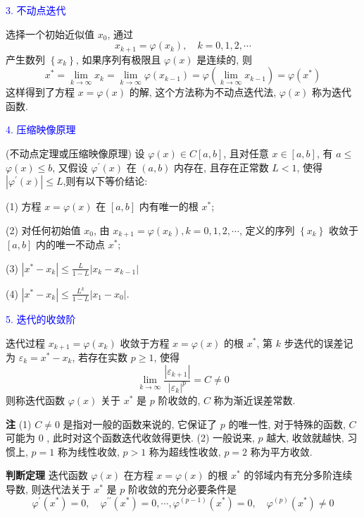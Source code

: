 \textcolor{blue}{3. 不动点迭代}

选择一个初始近似值 $ x_{0} $, 通过
$$
x_{k+1}=\varphi\left(x_{k}\right), \quad k=0,1,2, \cdots
$$
产生数列 $ \left\{x_{k}\right\} $, 如果序列有极限且 $ \varphi(x) $ 是连续的, 则
$$
x^{*}=\lim _{k \rightarrow \infty} x_{k}=\lim _{k \rightarrow \infty} \varphi\left(x_{k-1}\right)=\varphi\left(\lim _{k \rightarrow \infty} x_{k-1}\right)=\varphi\left(x^{*}\right)
$$
这样得到了方程 $ x=\varphi(x) $ 的解, 这个方法称为不动点迭代法, $ \varphi(x) $ 称为迭代函数.

\textcolor{blue}{4. 压缩映像原理}

(不动点定理或压缩映像原理) 设 $ \varphi(x) \in C[a, b] $, 且对任意 $ x \in[a, b] $, 有 $ a \leqslant $ $ \varphi(x) \leqslant b $, 又假设 $ \varphi^{\prime}(x) $ 在 $ (a, b) $ 内存在, 且存在正常数 $ L<1 $, 使得 $ \left|\varphi^{\prime}(x)\right| \leqslant L $,则有以下等价结论:

(1) 方程 $ x=\varphi(x) $ 在 $ [a, b] $ 内有唯一的根 $ x^{*} $;

(2) 对任何初始值 $ x_{0} $, 由 $ x_{k+1}=\varphi\left(x_{k}\right), k=0,1,2, \cdots $, 定义的序列 $ \left\{x_{k}\right\} $ 收敛于 $ [a, b] $ 内的唯一不动点 $ x^{*} ; $

(3) $\displaystyle \left|x^{*}-x_{k}\right| \leqslant \frac{L}{1-L}\left|x_{k}-x_{k-1}\right| $

(4) $\displaystyle \left|x^{*}-x_{k}\right| \leqslant \frac{L^{k}}{1-L}\left|x_{1}-x_{0}\right| $.

\textcolor{blue}{5. 迭代的收敛阶}

迭代过程 $ x_{k+1}=\varphi\left(x_{k}\right) $ 收敛于方程 $ x=\varphi(x) $ 的根 $ x^{*} $, 第 $ k $ 步迭代的误差记为 $ \varepsilon_{k}=x^{*}-x_{k} $, 若存在实数 $ p \geqslant 1 $, 使得
$$
\lim _{k \rightarrow \infty} \frac{\left|\varepsilon_{k+1}\right|}{\left|\varepsilon_{k}\right|^{p}}=C \neq 0
$$
则称迭代函数 $ \varphi(x) $ 关于 $ x^{*} $ 是 $ p $ 阶收敛的, $ C $ 称为渐近误差常数.

\textbf{注 }\; (1) $ C \neq 0 $ 是指对一般的函数来说的, 它保证了 $ p $ 的唯一性, 对于特殊的函数, $ C $ 可能为 0 , 此时对这个函数迭代收敛得更快. (2) 一般说来, $ p $ 越大, 收敛就越快, 习惯上, $ p=1 $ 称为线性收敛, $ p>1 $ 称为超线性收敛, $ p=2 $ 称为平方收敛.

\textbf{判断定理} \; 迭代函数 $ \varphi(x) $ 在方程 $ x=\varphi(x) $ 的根 $ x^{*} $ 的邻域内有充分多阶连续导数, 则迭代法关于 $ x^{*} $ 是 $ p $ 阶收敛的充分必要条件是
$$
\varphi^{\prime}\left(x^{*}\right)=0, \quad \varphi^{\prime \prime}\left(x^{*}\right)=0, \cdots, \varphi^{(p-1)}\left(x^{*}\right)=0, \quad \varphi^{(p)}\left(x^{*}\right) \neq 0
$$

